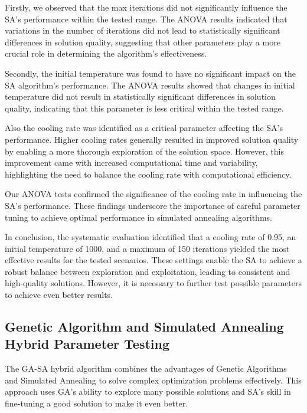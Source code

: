 \documentclass{article}
\begin{document}
    Firstly, we observed that the max iterations did not significantly influence the SA's performance within the tested range. The ANOVA results indicated that variations in the number of iterations did not lead to statistically significant differences in solution quality, suggesting that other parameters play a more crucial role in determining the algorithm's effectiveness.

    Secondly, the initial temperature was found to have no significant impact on the SA algorithm's performance. The ANOVA results showed that changes in initial temperature did not result in statistically significant differences in solution quality, indicating that this parameter is less critical within the tested range.

     Also the cooling rate was identified as a critical parameter affecting the SA’s performance. Higher cooling rates generally resulted in improved solution quality by enabling a more thorough exploration of the solution space. However, this improvement came with increased computational time and variability, highlighting the need to balance the cooling rate with computational efficiency.

    Our ANOVA tests confirmed the significance of the cooling rate in influencing the SA’s performance. These findings underscore the importance of careful parameter tuning to achieve optimal performance in simulated annealing algorithms.

    In conclusion, the systematic evaluation identified that a cooling rate of 0.95, an initial temperature of 1000, and a maximum of 150 iterations yielded the most effective results for the tested scenarios. These settings enable the SA to achieve a robust balance between exploration and exploitation, leading to consistent and high-quality solutions. However, it is necessary to further test possible parameters to achieve even better results.

    \newpage


    \subsection{Genetic Algorithm and Simulated Annealing Hybrid Parameter Testing}\label{subsec:genetic-algorithm-and-simulated-annealing-hybrid-parameter-testing}

    The GA-SA hybrid algorithm combines the advantages of Genetic Algorithms and Simulated Annealing to solve complex optimization problems effectively. This approach uses GA's ability to explore many possible solutions and SA's skill in fine-tuning a good solution to make it even better.
\end{document}
